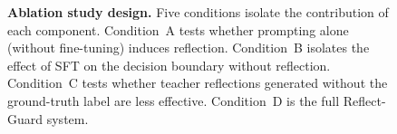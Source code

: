 \documentclass[superintelligence,article,accept,moreauthors]{Definitions/mdpi}
\renewcommand{\hl}[1]{#1}
\begin{document}
\begin{figure}[H]
{}%
\caption{\textbf{\hl{Ablation study design.} %
}
Five conditions isolate the contribution of each component.
Condition~A tests whether prompting alone (without fine-tuning) induces reflection.
Condition~B isolates the effect of SFT on the decision boundary without reflection.
Condition~C tests whether teacher reflections generated without the ground-truth label are less effective.
Condition~D is the full Reflect-Guard system.\label{fig:ablation}}
\end{figure}






\vspace{-6pt}
\end{document}
